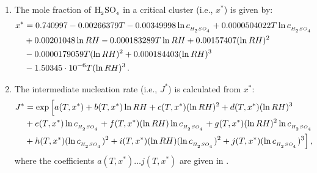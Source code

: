 \begin{enumerate}
  \item The mole fraction of $\rm H_{_2}SO_{_4}$ in a critical cluster (i.e., $x^*$) is
        given by:
    \begin{align}
      x^* &= 0.740997 - 0.00266379 T - 0.00349998 \ln c_{_{H_{_2}SO_{_4}}}
             + 0.0000504022 T \ln c_{_{H_{_2}SO_{_4}}} \nonumber \\
          &+ 0.00201048 \ln RH - 0.000183289 T \ln RH
             + 0.00157407 (\ln RH)^2 \nonumber \\
          &- 0.0000179059 T (\ln RH)^2 + 0.000184403 (\ln RH)^3 \nonumber \\
          &- 1.50345 \cdot 10^{-6} T (\ln RH)^3 \,.
    \end{align}
  \item The intermediate nucleation rate (i.e., $J^*$) is calculated from
        $x^*$:
        \begin{align}
          J^* &= \exp \Big[ a(T,x^*) + b(T,x^*) \ln RH +
                 c(T,x^*) (\ln RH)^2 + d(T,x^*) (\ln RH)^3 \nonumber \\
              &+ e(T,x^*) \ln c\dsub{\sag} + f(T,x^*) (\ln RH) \ln c\dsub{\sag}
                 + g(T,x^*) (\ln RH)^2 \ln c\dsub{\sag} \nonumber \\
              &+ h(T,x^*) (\ln c\dsub{\sag})^2 + i(T,x^*) (\ln RH)
                (\ln c\dsub{\sag})^2 + j(T,x^*) (\ln c\dsub{\sag})^3 \Big] \,, \labeleq{vk2002_nucrate}
        \end{align}
        where the coefficients $a(T,x^*) \dots j(T,x^*)$ are given in
        .

\end{enumerate}
